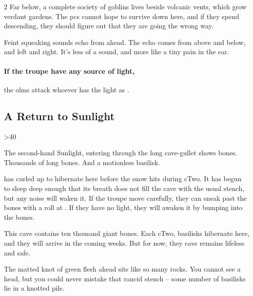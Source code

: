 \begin{multicols}{2}
Far below, a complete society of goblins lives beside volcanic vents, which grow verdant gardens.
The \glspl{pc} cannot hope to survive down here, and if they spend  descending, they should figure out that they are going the wrong way.



\begin{boxtext}
  Feint squeaking sounds echo from ahead.
  The echo comes from above and below, and left and right.
  It's less of a sound, and more like a tiny pain in the ear.
\end{boxtext}

\paragraph{If the troupe have any source of light,}
the \glspl{olm} attack whoever has the light as .

\olmSwarm


\subsection{A Return to Sunlight}


\ifcase\thecycle%
  \ifnum\thefenestraDay>40%
    \begin{boxtext}
      The second-hand Sunlight, entering through the long cave-gullet shows bones.
      Thousands of long bones.
      And a motionless \gls{basilisk}.
    \end{boxtext}

     has curled up to hibernate here before the snow hits during \gls{cTwo}.
    It has begun to sleep deep enough that its breath does not fill the cave with the usual stench, but any noise will waken it.
    If the troupe move carefully, they can sneak past the bones with a  roll at \tn[9].
    If they have no light, they will awaken it by bumping into the bones.

    \basilisk
  \else%
    This cave contains ten thousand giant bones.
    Each \gls{cTwo}, \glspl{basilisk} hibernate here, and they will arrive in the coming weeks.
    But for now, they cave remains lifeless and safe.
  \fi%
\or%
  \begin{boxtext}
    The matted knot of green flesh ahead sits like so many rocks.
    You cannot see a head, but you could never mistake that rancid stench -- some number of \glspl{basilisk} lie in a knotted pile.
  \end{boxtext}


\end{multicols}
